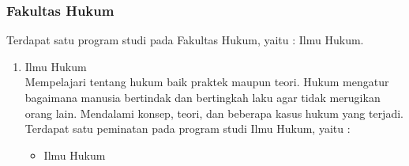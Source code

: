 \subsubsection{Fakultas Hukum}
Terdapat satu program studi pada Fakultas Hukum, yaitu : Ilmu Hukum.

	\begin{enumerate}
		\item Ilmu Hukum\\
			Mempelajari tentang hukum baik praktek maupun teori. Hukum mengatur bagaimana manusia bertindak dan bertingkah laku agar tidak merugikan orang lain. Mendalami konsep, teori, dan beberapa kasus hukum yang terjadi.\\
			
			Terdapat satu peminatan pada program studi Ilmu Hukum, yaitu :
			
			\begin{itemize}
				\item Ilmu Hukum
			\end{itemize}\leavevmode
			
	\end{enumerate}\leavevmode

